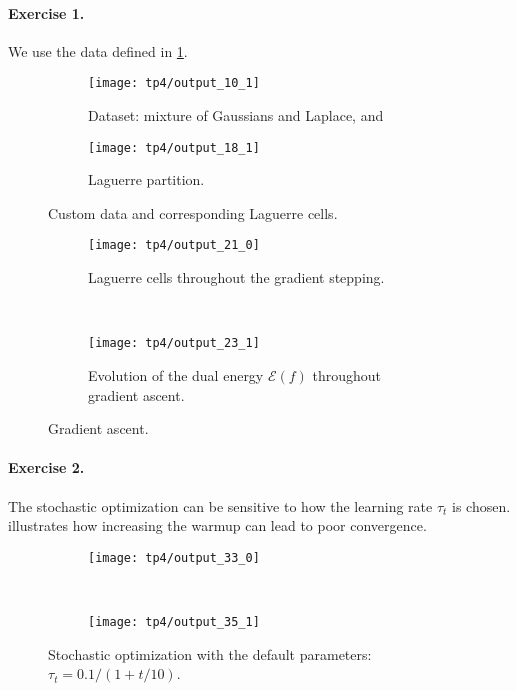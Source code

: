 \documentclass{article}
\newcommand{\calE}{\mathcal{E}}
\numberwithin{equation}{section}
\theoremstyle{definition}
\begin{document}
\paragraph{Exercise 1.} We use the data defined in \cref{fig:tp4output101}.
\begin{figure}[!h]
	\begin{subfigure}[t]{.49\linewidth}
		\centering
		\texttt{[image: tp4/output\_10\_1]}
		\caption{Dataset: mixture of Gaussians and Laplace, and}
		\label{fig:tp4output101}	
	\end{subfigure}
	\begin{subfigure}[t]{.49\linewidth}
		\centering
		\texttt{[image: tp4/output\_18\_1]}
		\caption{Laguerre partition.}
		\label{fig:tp4output181}
	\end{subfigure}	
	\caption{Custom data and corresponding Laguerre cells.}
\end{figure}

\begin{figure}[!h]
	\begin{subfigure}{.49\linewidth}
		\centering
		\texttt{[image: tp4/output\_21\_0]}
		\caption{Laguerre cells throughout the gradient stepping.}
		\label{fig:tp4output210}
	\end{subfigure}~
	\begin{subfigure}{.49\linewidth}
		\centering
		\texttt{[image: tp4/output\_23\_1]}
		\caption{Evolution of the dual energy $\calE(f)$ throughout gradient ascent.}
		\label{fig:output231}
	\end{subfigure}
	\caption{Gradient ascent.}
\end{figure}




\paragraph{Exercise 2.} The stochastic optimization can be sensitive to how the learning rate $\tau_t$ is chosen.  illustrates how increasing the warmup can lead to poor convergence.
\begin{figure}
	\begin{subfigure}{.49\linewidth}
		\centering
		\texttt{[image: tp4/output\_33\_0]}
		\caption{}
		\label{fig:output330}
	\end{subfigure}~
	\begin{subfigure}{.49\linewidth}
		\centering
		\texttt{[image: tp4/output\_35\_1]}
		\caption{}
		\label{fig:output351}
	\end{subfigure}
	\caption{Stochastic optimization with the default parameters: $\tau_t = 0.1/(1+t/10)$.}
\end{figure}
\end{document}
